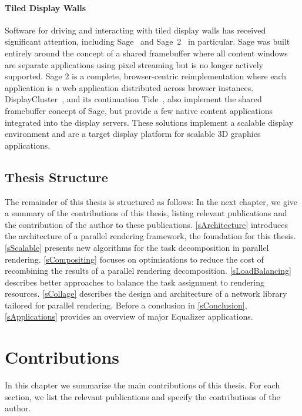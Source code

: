 \subsubsection{Tiled Display Walls}

Software for driving and interacting with tiled display walls has received
significant attention, including {Sage}~\cite{Sage} and
 {Sage~2}~\cite{Sage2} in particular. {Sage} was built entirely
around the concept of a shared framebuffer where all content windows are
separate applications using pixel streaming but is no longer actively supported.
{Sage 2} is a complete, browser-centric reimplementation where each
application is a web application distributed across browser instances.
{DisplayCluster}~\cite{DisplayCluster}, and its continuation
 {Tide}~\cite{tide}, also implement the shared framebuffer concept of
 {Sage}, but provide a few native content applications integrated into the
display servers. These solutions implement a scalable display environment and
are a target display platform for scalable 3D graphics applications.

\section{Thesis Structure}

The remainder of this thesis is structured as follows: In the next chapter, we
give a summary of the contributions of this thesis, listing relevant
publications and the contribution of the author to these publications.
\cref{sArchitecture} introduces the architecture of a parallel rendering
framework, the foundation for this thesis. \cref{sScalable} presents new
algorithms for the task decomposition in parallel rendering.
\cref{sCompositing} focuses on optimisations to reduce the cost of recombining
the results of a parallel rendering decomposition. \cref{sLoadBalancing}
describes better approaches to balance the task assignment to rendering
resources. \cref{sCollage} describes the design and architecture of a network
library tailored for parallel rendering. Before a conclusion in
\cref{sConclusion}, \cref{sApplications} provides an overview of major
Equalizer applications.


\chapter{Contributions}

In this chapter we summarize the main contributions of this thesis. For each
section, we list the relevant publications and specify the contributions of the
author.

